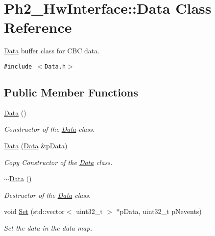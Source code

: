 \hypertarget{class_ph2___hw_interface_1_1_data}{
\section{Ph2\_\-Hw\-Interface::Data Class Reference}
\label{class_ph2___hw_interface_1_1_data}
}
\hyperlink{class_ph2___hw_interface_1_1_data}{Data} buffer class for CBC data.  


{\tt \#include $<$Data.h$>$}

\subsection*{Public Member Functions}
\begin{CompactItemize}
\item 
\hyperlink{class_ph2___hw_interface_1_1_data_72e6b3c8af444dd82569d3a47f89812c}{Data} ()
\begin{CompactList}\small\item\em Constructor of the \hyperlink{class_ph2___hw_interface_1_1_data}{Data} class. \item\end{CompactList}\item 
\hyperlink{class_ph2___hw_interface_1_1_data_efcb0c450523abe1c4397189f64a3aff}{Data} (\hyperlink{class_ph2___hw_interface_1_1_data}{Data} \&p\-Data)
\begin{CompactList}\small\item\em Copy Constructor of the \hyperlink{class_ph2___hw_interface_1_1_data}{Data} class. \item\end{CompactList}\item 
\hyperlink{class_ph2___hw_interface_1_1_data_889228098e5c0b4eb5d06ad7850cdd7e}{$\sim$Data} ()
\begin{CompactList}\small\item\em Destructor of the \hyperlink{class_ph2___hw_interface_1_1_data}{Data} class. \item\end{CompactList}\item 
void \hyperlink{class_ph2___hw_interface_1_1_data_fc701768a1f0920c07fc238c6cab185c}{Set} (std::vector$<$ uint32\_\-t $>$ $\ast$p\-Data, uint32\_\-t p\-Nevents)
\begin{CompactList}\small\item\em Set the data in the data map. \item\end{CompactList}\item 

\end{CompactItemize}
